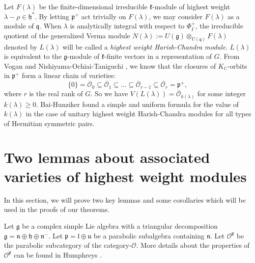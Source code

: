 \documentclass{amsart}[12pt]
\def\fnn{\mathfrak{n}}
\def\fuu{\mathfrak{u}}
\def\fll{\mathfrak{l}}
\renewcommand{\subset}{\subseteq}
\numberwithin{equation}{section}
\begin{document}
Let $F(\lambda)$ be the finite-dimensional irreducible $\mathfrak{k}$-module of highest weight $\lambda-\rho \in \mathfrak{h}^*$. By letting $\mathfrak{p}^+$ act trivially on $F(\lambda)$, we may consider $F(\lambda)$ as a module of $\mathfrak{q}$. When $\lambda $ is analytically integral with respect to $\Phi_I^+$, the irreducible quotient of the  generalized Verma module
$
N(\lambda):=U(\mathfrak{g})\otimes_{U(\mathfrak{q})}F(\lambda)
$ denoted by $L(\lambda)$ will be called a \textit{highest weight Harish-Chandra module}.
$L(\lambda)$ is equivalent to the $\mathfrak{g}$-module of $\mathfrak{k}$-finite vectors in a representation of $G$.  From Vogan \cite{Vo91} and Nishiyama-Ochiai-Taniguchi \cite{NOT}, we know that the closures of $K_\mathbb{C}$-orbits in $ \mathfrak{p}^+ $ form a linear chain of varieties:
\begin{equation}\label{eq:chain}
\{0\}={\bar{\mathcal{O}}}_0\subset \bar{\mathcal{O}}_1\subset ...\subset\bar{\mathcal{O}}_{r-1}\subset \bar{\mathcal{O}}_r=\mathfrak{p}^+,
\end{equation}
where $r$ is the real rank of $G$. So we have
$V(L(\lambda))=\bar{\mathcal{O}}_{k(\lambda)}$ for some integer $k(\lambda)\geq 0$.
Bai-Hunziker \cite{BH} found a simple and uniform formula for the value of $k(\lambda)$ in the case of unitary highest weight Harish-Chandra modules for all types of Hermitian symmetric pairs.


















\section{Two lemmas about associated varieties of highest weight modules}
In this section, we will prove two key lemmas and some corollaries which will be used in the proofs of our theorems.

Let $\mathfrak{g}$ be a complex simple Lie algebra with a triangular decomposition $\mathfrak{g}=\mathfrak{n}\oplus \mathfrak{h} \oplus \mathfrak{n}^-$. Let $\mathfrak{p} = \fll\oplus \fuu$ be a parabolic subalgebra containing $\fnn$.
Let $\mathscr{O}^{\mathfrak{p}}$ be the parabolic subcategory of the category-$\mathscr{O}$. More details about the properties of $\mathscr{O}^{\mathfrak{p}}$ can be found in Humphreys \cite{Hum}.
\end{document}
